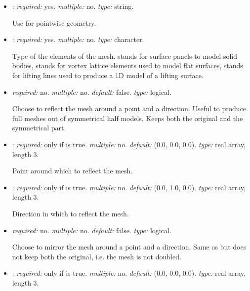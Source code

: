 \begin{itemize}

\item {}: \textit{required:} yes. \textit{multiple:} no. \textit{type:} string. 

Use  for pointwise geometry.

\item {}: \textit{required:} yes. \textit{multiple:} no. \textit{type:} character.

    Type of the elements of the mesh.  stands for surface panels to model solid bodies,  stands for vortex lattice elements used to model flat surfaces, {\color{red} stands for lifting lines used to produce a 1D model of a lifting surface}. 

\item {} \textit{required:} no. \textit{multiple:} no. \textit{default:} false. \textit{type:} logical.

Choose to reflect the mesh around a point and a direction. Useful to produce full meshes out of symmetrical half models. Keeps both the original and the symmetrical part. 

\item {}: \textit{required:} only if  is true. \textit{multiple:} no. \textit{default:} (0.0, 0.0, 0.0). \textit{type:} real array, length 3.

Point around which to reflect the mesh.

\item {}: \textit{required:} only if  is true. \textit{multiple:} no. \textit{default:} (0.0, 1.0, 0.0). \textit{type:} real array, length 3.

Direction in which to reflect the mesh.

\item {} \textit{required:} no. \textit{multiple:} no. \textit{default:} false. \textit{type:} logical.

Choose to mirror the mesh around a point and a direction. Same as  but does not keep both the original, i.e. the mesh is not doubled.

\item {}: \textit{required:} only if  is true. \textit{multiple:} no. \textit{default:} (0.0, 0.0, 0.0). \textit{type:} real array, length 3.


\end{itemize}
